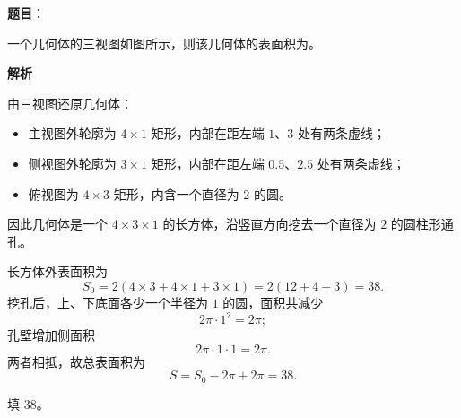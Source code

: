 \begin{answer}

\textbf{题目}：

一个几何体的三视图如图所示，则该几何体的表面积为\gkblank{}。
\nopagebreak[4]
\begin{center}\end{center}
\nopagebreak[4]
\textbf{解析}

由三视图还原几何体：

\begin{itemize}
\item 主视图外轮廓为 $4\times1$ 矩形，内部在距左端 $1$、$3$ 处有两条虚线；
\item 侧视图外轮廓为 $3\times1$ 矩形，内部在距左端 $0.5$、$2.5$ 处有两条虚线；
\item 俯视图为 $4\times3$ 矩形，内含一个直径为 $2$ 的圆。
\end{itemize}

因此几何体是一个 $4\times3\times1$ 的长方体，沿竖直方向挖去一个直径为 $2$ 的圆柱形通孔。

长方体外表面积为
\nopagebreak[4]
\[S_0=2(4\times3+4\times1+3\times1)=2(12+4+3)=38.\]
挖孔后，上、下底面各少一个半径为 $1$ 的圆，面积共减少
\nopagebreak[4]
\[2\pi\cdot1^2=2\pi;\]
孔壁增加侧面积
\nopagebreak[4]
\[2\pi\cdot1\cdot1=2\pi.\]
两者相抵，故总表面积为
\nopagebreak[4]
\[S=S_0-2\pi+2\pi=38.\]

填 $38$。


\end{answer}
